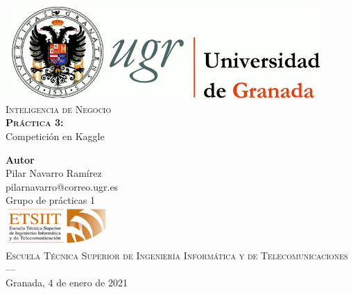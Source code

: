 \begin{titlepage}
 
 
\newlength{\centeroffset}
\setlength{\centeroffset}{-0.5\oddsidemargin}
\addtolength{\centeroffset}{0.5\evensidemargin}
\thispagestyle{empty}

\noindent\hspace*{\centeroffset}\begin{minipage}{\textwidth}

\centering
\includegraphics[width=0.9\textwidth]{img/logo_ugr.jpg}\\[2cm]

\textsc{ \Huge Inteligencia de Negocio\\[1.5cm]}
\textbf{\textsc{ \huge Práctica 3:}}\\
 \huge  Competición en Kaggle\\[1cm]
% 
\end{minipage}

\vspace{2cm}
\noindent\hspace*{\centeroffset}\begin{minipage}{\textwidth}
\centering

\textbf{Autor}\\[0.2cm] {Pilar Navarro Ramírez}\\[0.2cm]
pilarnavarro@correo.ugr.es \\[0.2cm]
Grupo de prácticas 1 \\[1cm]

\includegraphics[width=0.3\textwidth]{img/etsiit_logo.png}\\[0.1cm]
\textsc{Escuela Técnica Superior de Ingeniería Informática y de Telecomunicaciones}\\
\textsc{---}\\
Granada, 4 de enero de 2021
\end{minipage}
\end{titlepage}


